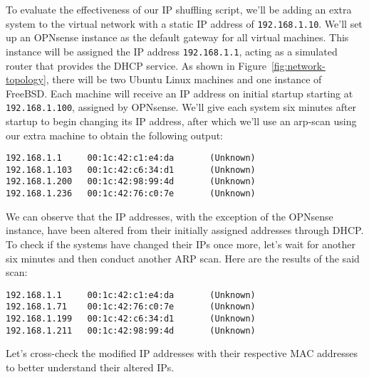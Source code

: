 To evaluate the effectiveness of our IP shuffling script, we'll be adding an extra system to the virtual network with a static IP address of \texttt{192.168.1.10}. We'll set up an OPNsense instance as the default gateway for all virtual machines. This instance will be assigned the IP address \texttt{192.168.1.1}, acting as a simulated router that provides the DHCP service. As shown in Figure~\ref{fig:network-topology}, there will be two Ubuntu Linux machines and one instance of FreeBSD. Each machine will receive an IP address on initial startup starting at \texttt{192.168.1.100}, assigned by OPNsense. We'll give each system six minutes after startup to begin changing its IP address, after which we'll use an arp-scan using our extra machine to obtain the following output:
\begin{verbatim}
192.168.1.1     00:1c:42:c1:e4:da       (Unknown)
192.168.1.103   00:1c:42:c6:34:d1       (Unknown)
192.168.1.200   00:1c:42:98:99:4d       (Unknown)
192.168.1.236   00:1c:42:76:c0:7e       (Unknown)
\end{verbatim}
We can observe that the IP addresses, with the exception of the OPNsense instance, have been altered from their initially assigned addresses through DHCP. To check if the systems have changed their IPs once more, let's wait for another six minutes and then conduct another ARP scan. Here are the results of the said scan:
\begin{verbatim}
192.168.1.1     00:1c:42:c1:e4:da       (Unknown)
192.168.1.71    00:1c:42:76:c0:7e       (Unknown)
192.168.1.199   00:1c:42:c6:34:d1       (Unknown)
192.168.1.211   00:1c:42:98:99:4d       (Unknown)
\end{verbatim}
Let's cross-check the modified IP addresses with their respective MAC addresses to better understand their altered IPs.

